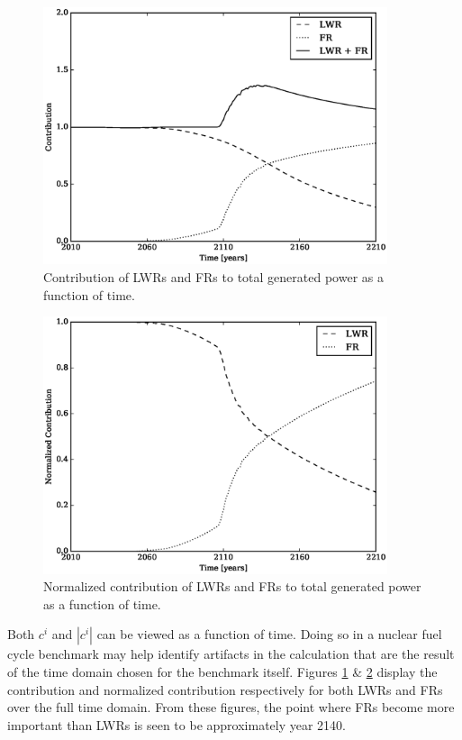 \begin{figure}[htb]
\centering
\includegraphics[width=0.9\textwidth]{c-of-t.eps}
\caption{Contribution of LWRs and FRs to total generated power as a 
function of time.}
\label{c-of-t}
\end{figure}

\begin{figure}[htb]
\centering
\includegraphics[width=0.9\textwidth]{normc-of-t.eps}
\caption{Normalized contribution of LWRs and FRs to total generated power 
as a function of time.}
\label{normc-of-t}
\end{figure}

Both $c^i$ and $|c^i|$ can be viewed as a function of time.
Doing so in a nuclear fuel cycle benchmark may help identify artifacts in the
calculation that are the result of the time domain chosen for the benchmark itself.
Figures \ref{c-of-t} \& \ref{normc-of-t} display the contribution and 
normalized contribution respectively for both LWRs and FRs over the full 
time domain. From these figures, the point where FRs become more important 
than LWRs is seen to be approximately year 2140.
